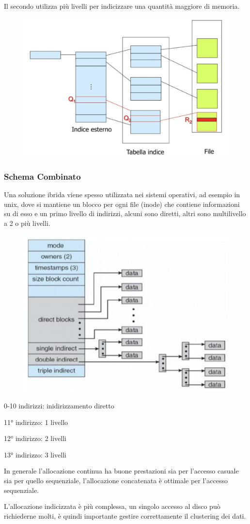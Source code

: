 \spacer
Il secondo utilizza più livelli per indicizzare una quantità maggiore di memoria.

\begin{figure}[H]
    \centering
    \includegraphics[width=0.4\linewidth]{assets/indici-multilivello.png}
\end{figure}

\subsubsection{Schema Combinato}
Una soluzione ibrida viene spesso utilizzata nei sistemi operativi, ad esempio in unix, dove si mantiene un blocco per ogni file (inode) che contiene informazioni su di esso e un primo livello di indirizzi, alcuni sono diretti, altri sono multilivello a 2 o più livelli.

\begin{figure}[H]
    \centering
    \includegraphics[width=0.4\linewidth]{assets/inode-ibrido.png}
\end{figure}

\begin{sitemize}
    \item 0-10 indirizzi: inidirizzamento diretto
    \item 11° indirizzo: 1 livello
    \item 12° indirizzo: 2 livelli
    \item 13° indirizzo: 3 livelli
\end{sitemize}

\begin{note}
    In generale l'allocazione continua ha buone prestazioni sia per l'accesso casuale sia per quello sequenziale, l'allocazione concatenata è ottimale per l'accesso sequenziale.

    \spacer
    L'allocazione indicizzata è più complessa, un singolo accesso al disco può richiederne molti, è quindi importante gestire correttamente il clustering dei dati.
\end{note}


